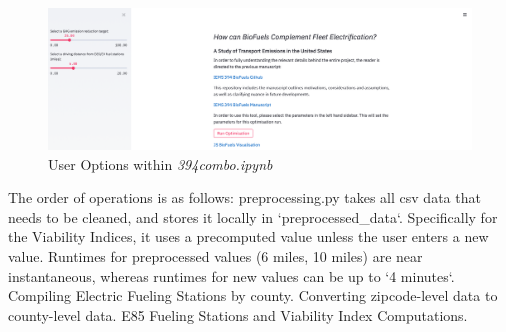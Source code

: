 \documentclass[answers]{exam}
\begin{document}
\begin{figure}[h]
    \centering
    \includegraphics[scale=0.4]{user_options.png}
    \caption{User Options within \textit{394combo.ipynb}}
    \label{fig:my_label}
\end{figure}
\begin{outline}
The order of operations is as follows:
\2\colorbox{dandelion}{preprocessing.py} takes all csv data that needs to be cleaned, and stores it locally in `preprocessed\_data`. Specifically for the Viability Indices, it uses a precomputed value unless the user enters a new value. Runtimes for preprocessed values (6 miles, 10 miles) are near instantaneous, whereas runtimes for new values can be up to `4 minutes`.
\3 Compiling Electric Fueling Stations by county.
\3 Converting zipcode-level data to county-level data.
\3 E85 Fueling Stations and Viability Index Computations.


\end{outline}
\end{document}
